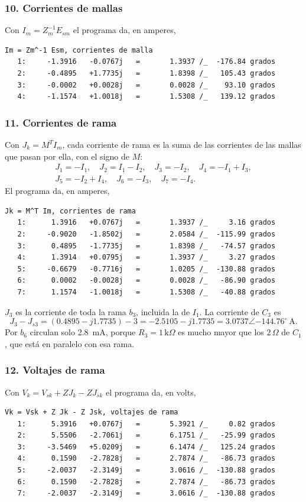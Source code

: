 \documentclass[12pt, letterpaper]{article}
\newcommand{\pol}[2]{#1\angle {#2}^{\circ}}
\newcommand{\paso}[1]{\subsubsection*{#1}}
\begin{document}
\paso{10. Corrientes de mallas}

Con $I_m = Z_m^{-1} E_{sm}$ el programa da, en amperes,
\begin{lstlisting}[style=salida]
Im = Zm^-1 Esm, corrientes de malla
   1:     -1.3916   -0.0767j   =       1.3937 /_  -176.84 grados
   2:     -0.4895   +1.7735j   =       1.8398 /_   105.43 grados
   3:     -0.0002   +0.0028j   =       0.0028 /_    93.10 grados
   4:     -1.1574   +1.0018j   =       1.5308 /_   139.12 grados
\end{lstlisting}

\paso{11. Corrientes de rama}

Con $J_k = M^T I_m$, cada corriente de rama es la suma de las corrientes de las mallas que pasan por ella, con el signo
de $M$:
\begin{gather*}
J_1 = -I_1, \quad J_2 = I_1 - I_2, \quad J_3 = -I_2, \quad J_4 = -I_1 + I_3, \\
J_5 = -I_2 + I_4, \quad J_6 = -I_3, \quad J_7 = -I_4 .
\end{gather*}
El programa da, en amperes,
\begin{lstlisting}[style=salida]
Jk = M^T Im, corrientes de rama
   1:      1.3916   +0.0767j   =       1.3937 /_     3.16 grados
   2:     -0.9020   -1.8502j   =       2.0584 /_  -115.99 grados
   3:      0.4895   -1.7735j   =       1.8398 /_   -74.57 grados
   4:      1.3914   +0.0795j   =       1.3937 /_     3.27 grados
   5:     -0.6679   -0.7716j   =       1.0205 /_  -130.88 grados
   6:      0.0002   -0.0028j   =       0.0028 /_   -86.90 grados
   7:      1.1574   -1.0018j   =       1.5308 /_   -40.88 grados
\end{lstlisting}

$J_3$ es la corriente de toda la rama $b_3$, incluida la de $I_1$. La corriente de $C_3$ es
\[
J_3 - J_{s3} = (0.4895 - j1.7735) - 3 = -2.5105 - j1.7735 = \pol{3.0737}{-144.76}\ \text{A}.
\]
Por $b_6$ circulan solo 2.8~mA, porque $R_3 = 1\,\text{k}\Omega$ es mucho mayor que los $2\,\Omega$ de $C_1$, que
está en paralelo con esa rama.

\paso{12. Voltajes de rama}

Con $V_k = V_{sk} + Z J_k - Z J_{sk}$ el programa da, en volts,
\begin{lstlisting}[style=salida]
Vk = Vsk + Z Jk - Z Jsk, voltajes de rama
   1:      5.3916   +0.0767j   =       5.3921 /_     0.82 grados
   2:      5.5506   -2.7061j   =       6.1751 /_   -25.99 grados
   3:     -3.5469   +5.0209j   =       6.1474 /_   125.24 grados
   4:      0.1590   -2.7828j   =       2.7874 /_   -86.73 grados
   5:     -2.0037   -2.3149j   =       3.0616 /_  -130.88 grados
   6:      0.1590   -2.7828j   =       2.7874 /_   -86.73 grados
   7:     -2.0037   -2.3149j   =       3.0616 /_  -130.88 grados
\end{lstlisting}
\end{document}
